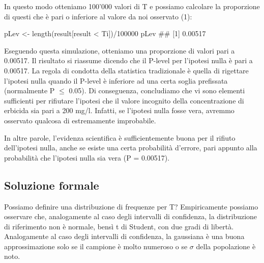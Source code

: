 \documentclass[a4paper,12pt,oneside]{book}
\newenvironment{Shaded}{}{}
\newcommand{\KeywordTok}[1]{#1}
\newcommand{\DecValTok}[1]{#1}
\newcommand{\StringTok}[1]{#1}
\newcommand{\CommentTok}[1]{#1}
\newcommand{\OperatorTok}[1]{#1}
\newcommand{\NormalTok}[1]{#1}
\begin{document}
In questo modo otteniamo 100'000 valori di T e possiamo calcolare la proporzione di questi che è pari o inferiore al valore da noi osservato (1):

\begin{Shaded}
\begin{Highlighting}[]
\NormalTok{pLev <-}\StringTok{ }\KeywordTok{length}\NormalTok{(result[result }\OperatorTok{<}\StringTok{ }\NormalTok{Ti])}\OperatorTok{/}\DecValTok{100000}
\NormalTok{pLev}
\CommentTok{## [1] 0.00517}
\end{Highlighting}
\end{Shaded}

Eseguendo questa simulazione, otteniamo una proporzione di valori pari a 0.00517. Il risultato si riassume dicendo che il P-level per l'ipotesi nulla è pari a 0.00517. La regola di condotta della statistica tradizionale è quella di rigettare l'ipotesi nulla quando il P-level è inferiore ad una certa soglia prefissata (normalmente P \(\leq\) 0.05). Di conseguenza, concludiamo che vi sono elementi sufficienti per rifiutare l'ipotesi che il valore incognito della concentrazione di erbicida sia pari a 200 mg/l. Infatti, se l'ipotesi nulla fosse vera, avremmo osservato qualcosa di estremamente improbabile.

In altre parole, l'evidenza scientifica è sufficientemente buona per il rifiuto dell'ipotesi nulla, anche se esiste una certa probabilità d'errore, pari appunto alla probabilità che l'ipotesi nulla sia vera (P = 0.00517).

\hypertarget{soluzione-formale}{%
\subsection{Soluzione formale}\label{soluzione-formale}}

Possiamo definire una distribuzione di frequenze per T? Empiricamente possiamo osservare che, analogamente al caso degli intervalli di confidenza, la distribuzione di riferimento non è normale, bensì t di Student, con due gradi di libertà. Analogamente al caso degli intervalli di confidenza, la gaussiana è una buona approssimazione solo se il campione è molto numeroso o se \(\sigma\) della popolazione è noto.
\end{document}
